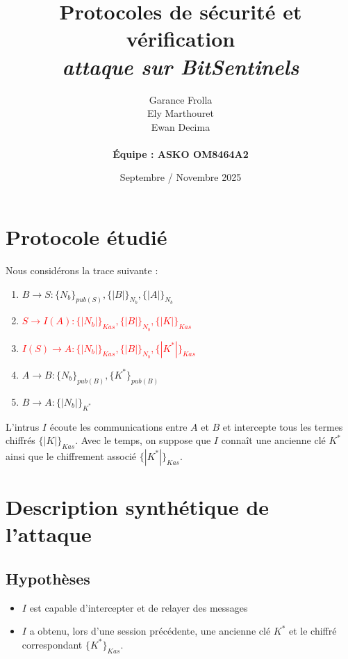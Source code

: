 \documentclass[11pt]{article}
\begin{document}
\title{\textbf{Protocoles de sécurité et vérification} \\
{\small \textit{attaque sur BitSentinels}}}

\author{Garance Frolla \\ Ely Marthouret \\ Ewan Decima \\\\ \textbf{Équipe : ASKO OM8464A2}}
\date{Septembre / Novembre 2025}

\maketitle
\tableofcontents
\newpage

\section{Protocole étudié}

Nous considérons la trace suivante  :

\begin{enumerate}
    \item $B \rightarrow S : \{N_b\}_{pub(S)}, \{|B|\}_{N_b}, \{|A|\}_{N_b}$
    \item \textcolor{red}{ $S \rightarrow I(A) : \{|N_b|\}_{Kas}, \{|B|\}_{N_b}, \{|K|\}_{Kas}$}
    \item \textcolor{red} {$I(S) \rightarrow A : \{|N_b|\}_{Kas}, \{|B|\}_{N_b}, \{|K^*|\}_{Kas}$}
    \item $A \rightarrow B : \{N_b\}_{pub(B)}, \{K^*\}_{pub(B)}$
    \item $B \rightarrow A : \{|N_b|\}_{K^*}$
\end{enumerate}

\bigskip
\noindent
L'intrus $I$ écoute les communications entre $A$ et $B$ et intercepte tous les termes chiffrés $\{|K|\}_{Kas}$. Avec le temps, on suppose que $I$ connaît une ancienne clé $K^*$ ainsi que le chiffrement associé $\{|K^*|\}_{Kas}$.

\section{Description synthétique de l'attaque}

\subsection{Hypothèses}
\begin{itemize}
    \item $I$ est capable d'intercepter et de relayer des messages 
    \item $I$ a obtenu, lors d'une session précédente, une ancienne clé $K^*$ et le chiffré correspondant $\{K^*\}_{Kas}$.

\end{itemize}
\end{document}
